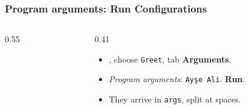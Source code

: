 \documentclass[aspectratio=169,10pt,compress]{beamer}
\begin{document}
\begin{frame}[t,fragile] \frametitle{Program arguments: Run Configurations}
  \begin{columns}[T]
    \begin{column}{0.55\textwidth}
    \end{column}
    \begin{column}{0.41\textwidth}
      \begin{itemize}\small
        \item {}, choose \texttt{Greet}, tab \textbf{Arguments}.
        \item \emph{Program arguments}: \texttt{Ayşe Ali}. \textbf{Run}.
        \item They arrive in \texttt{args}, split at spaces.
      \end{itemize}
    \end{column}
  \end{columns}
\end{frame}

\end{document}
